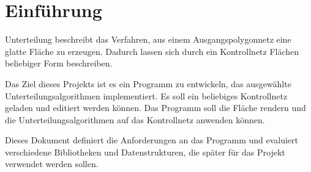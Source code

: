 \chapter{Einführung}

Unterteilung beschreibt das Verfahren, aus einem Ausgangspolygonnetz eine glatte Fläche zu erzeugen.
Dadurch lassen sich durch ein Kontrollnetz Flächen beliebiger Form beschreiben.

Das Ziel dieses Projekts ist es ein Programm zu entwickeln, das ausgewählte Unterteilungsalgorithmen implementiert.
Es soll ein beliebiges Kontrollnetz geladen und editiert werden können.
Das Programm soll die Fläche rendern und die Unterteilungsalgorithmen auf das Kontrollnetz anwenden können.

Dieses Dokument definiert die Anforderungen an das Programm und evaluiert verschiedene Bibliotheken und Datenstrukturen,
die später für das Projekt verwendet werden sollen.